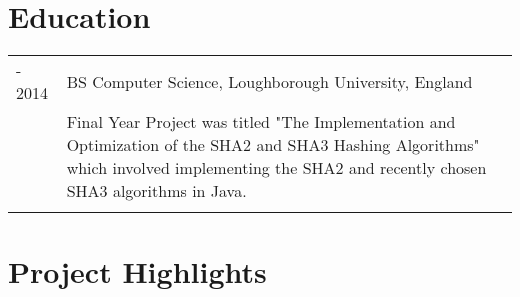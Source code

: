 \documentclass[12pt]{article}
\begin{document}
\section*{\selectfont Education}
\begin{tabular}{p{2.7cm}|p{15.0cm}}
	\centering 2011 - 2014 & BS Computer Science, Loughborough University, England\\&\small{Final Year Project was titled "The Implementation and Optimization of the SHA2 and SHA3 Hashing Algorithms" which involved implementing the SHA2 and recently chosen SHA3 algorithms in Java.}\\\multicolumn{2}{c}{} \\
\end{tabular}

\section*{\selectfont Project Highlights}
\end{document}
